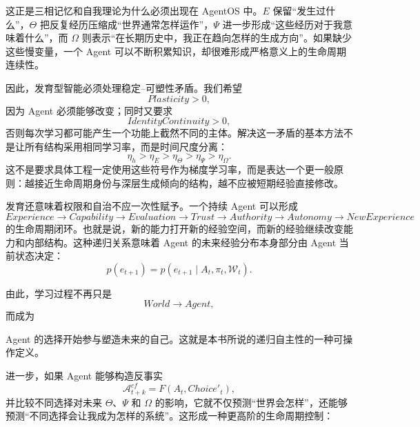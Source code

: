 这正是三相记忆和自我理论为什么必须出现在 AgentOS 中。$E$ 保留“发生过什么”，$\Theta$ 把反复经历压缩成“世界通常怎样运作”，$\Psi$ 进一步形成“这些经历对于我意味着什么”，而 $\Omega$ 则表示“在长期历史中，我正在趋向怎样的生成方向”。如果缺少这些慢变量，一个 Agent 可以不断积累知识，却很难形成严格意义上的生命周期连续性。

因此，发育型智能必须处理稳定--可塑性矛盾。我们希望
\begin{equation}
Plasticity>0,
\end{equation}
因为 Agent 必须能够改变；同时又要求
\begin{equation}
IdentityContinuity>0,
\end{equation}
否则每次学习都可能产生一个功能上截然不同的主体。解决这一矛盾的基本方法不是让所有结构采用相同学习率，而是时间尺度分离：
\begin{equation}
\eta_h
>
\eta_E
>
\eta_\Theta
>
\eta_\Psi
>
\eta_\Omega.
\end{equation}
这不是要求具体工程一定使用这些符号作为梯度学习率，而是表达一个更一般原则：越接近生命周期身份与深层生成倾向的结构，越不应被短期经验直接修改。

发育还意味着权限和自治不应一次性赋予。一个持续 Agent 可以形成
\begin{equation}
Experience
\rightarrow
Capability
\rightarrow
Evaluation
\rightarrow
Trust
\rightarrow
Authority
\rightarrow
Autonomy
\rightarrow
NewExperience
\end{equation}
的生命周期闭环。也就是说，新的能力打开新的经验空间，而新的经验继续改变能力和内部结构。这种递归关系意味着 Agent 的未来经验分布本身部分由 Agent 当前状态决定：
\begin{equation}
p(e_{t+1})
=
p
\left(
e_{t+1}
\mid
A_t,\pi_t,\mathcal{W}_t
\right).
\end{equation}

由此，学习过程不再只是
\begin{equation}
World\rightarrow Agent,
\end{equation}
而成为
\begin{statementbox}
\centering
{}
\end{statementbox}
Agent 的选择开始参与塑造未来的自己。这就是本书所说的递归自主性的一种可操作定义。

进一步，如果 Agent 能够构造反事实
\begin{equation}
\mathcal{A}^{cf}_{t+k}
=
F
\left(
A_t,
Choice'_t
\right),
\end{equation}
并比较不同选择对未来 $\Theta$、$\Psi$ 和 $\Omega$ 的影响，它就不仅预测“世界会怎样”，还能够预测“不同选择会让我成为怎样的系统”。这形成一种更高阶的生命周期控制：
\begin{statementbox}
\centering
{}
\end{statementbox}

